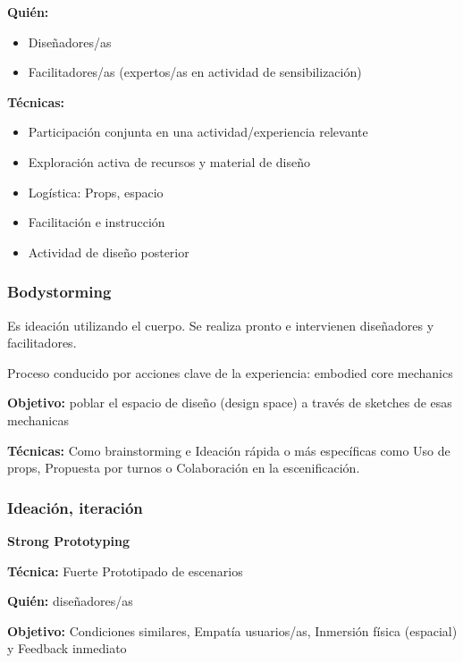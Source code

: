 \documentclass[12pt]{report} %
\begin{document}
\textbf{Quién:}
\begin{itemize}
  \item Diseñadores/as
  \item Facilitadores/as (expertos/as en actividad de sensibilización)
\end{itemize}

\textbf{Técnicas:}
\begin{itemize}
  \item Participación conjunta en una actividad/experiencia relevante
  \item Exploración activa de recursos y material de diseño
  \item Logística: Props, espacio
  \item Facilitación e instrucción
  \item Actividad de diseño posterior
\end{itemize}

\subsubsection{Bodystorming}
Es ideación utilizando el cuerpo. Se realiza pronto e intervienen diseñadores y facilitadores.

Proceso conducido por acciones clave de la experiencia: embodied core mechanics

\textbf{Objetivo:} poblar el espacio de diseño (design space) a través de sketches de esas mechanicas

\textbf{Técnicas:} Como brainstorming e Ideación rápida o más específicas como Uso de props, Propuesta por turnos o Colaboración en la escenificación.

\subsubsection{Ideación, iteración}
\textbf{Strong Prototyping}

\textbf{Técnica:} Fuerte Prototipado de escenarios

\textbf{Quién:} diseñadores/as

\textbf{Objetivo:} Condiciones similares, Empatía usuarios/as, Inmersión física (espacial) y Feedback inmediato
\end{document}
